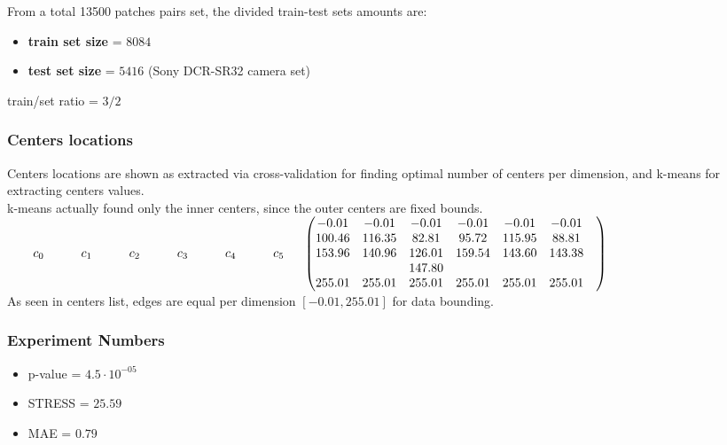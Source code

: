 		From a total 13500 patches pairs set, the divided train-test sets amounts are:
		\begin{itemize}
			\item \textbf{train set size} = $8084$ 
			\item \textbf{test set size} = $5416$ (Sony DCR-SR32 camera set)
		\end{itemize}
		
		train/set ratio = $3/2$

	\subsubsection{Centers locations}
	
	Centers locations are shown as extracted via cross-validation for finding optimal number of centers per dimension, and k-means for extracting centers values. \\
	k-means actually found only the inner centers, since the outer centers are fixed bounds.\\


	$
	\begin{matrix}  \qquad  c_0 \quad  \qquad c_1 \quad  \qquad c_2 \qquad \quad  c_3 \qquad \quad c_4 \qquad \quad c_5 \quad \end{matrix}\\
			
	
	\begin{pmatrix}
			     -0.01 &     -0.01 &    -0.01 & -0.01   & -0.01   & -0.01    \\
				100.46 &   116.35 &    82.81 &    95.72 & 115.95 & 88.81     \\
				153.96 &   140.96 &   126.01 &   159.54 & 143.60 & 143.38    \\
				       &          &   147.80 &          &        &             \\
	     		 255.01 &  255.01 &   255.01 &   255.01 &  255.01 &  255.01 & \\
			\end{pmatrix}
	$ 
\\
	

	As seen in centers list, edges are equal per dimension $[-0.01 , 255.01]$ for data bounding.\\
	
	\subsubsection{Experiment Numbers}	
	\begin{itemize}
	\item 	p-value = $4.5 \cdot 10 ^{-05}$
	\item 	STRESS = $25.59$
	\item 	MAE = $0.79$
	
	\end{itemize}



